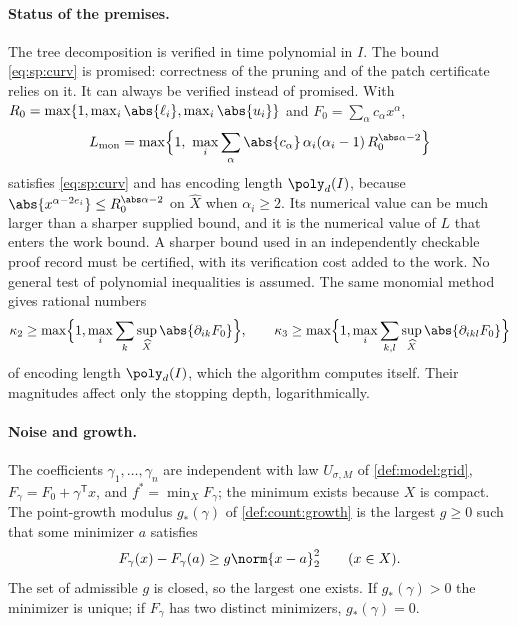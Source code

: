 \paragraph{Status of the premises.}
The tree decomposition is verified in time polynomial in $I$. The bound
\eqref{eq:sp:curv} is promised: correctness of the pruning and of the patch
certificate relies on it. It can always be verified instead of promised.
With $R_0=\max\{1,\max_i\abs{\ell_i},\max_i\abs{u_i}\}$ and $F_0=\sum_\alpha
c_\alpha x^\alpha$,
\begin{equation}\label{eq:sp:Lmon}
 L_{\rm mon}=\max\Bigl\{1,\ \max_i\sum_\alpha\abs{c_\alpha}\,
 \alpha_i(\alpha_i-1)\,R_0^{\abs\alpha-2}\Bigr\}
\end{equation}
satisfies \eqref{eq:sp:curv} and has encoding length $\poly_d(I)$, because
$\abs{x^{\alpha-2e_i}}\le R_0^{\abs\alpha-2}$ on $\widehat X$ when
$\alpha_i\ge2$. Its numerical value can be much larger than a sharper
supplied bound, and it is the numerical value of $L$ that enters the work
bound. A sharper bound used in an independently checkable proof record must
be certified, with its verification cost added to the work. No general test
of polynomial inequalities is assumed. The same monomial method gives
rational numbers
\begin{equation}\label{eq:sp:kappa}
 \kappa_2\ge\max\Bigl\{1,\max_i\sum_k\sup_{\widehat X}\abs{\partial_{ik}F_0}\Bigr\},
 \qquad
 \kappa_3\ge\max\Bigl\{1,\max_i\sum_{k,l}\sup_{\widehat X}\abs{\partial_{ikl}F_0}\Bigr\}
\end{equation}
of encoding length $\poly_d(I)$, which the algorithm computes itself. Their
magnitudes affect only the stopping depth, logarithmically.

\paragraph{Noise and growth.}
The coefficients $\gamma_1,\dots,\gamma_n$ are independent with law
$U_{\sigma,M}$ of \cref{def:model:grid}, $F_\gamma=F_0+\gamma^{\mathsf T}x$,
and $f^*=\min_XF_\gamma$; the minimum exists because $X$ is compact. The
point-growth modulus $g_*(\gamma)$ of \cref{def:count:growth} is the largest
$g\ge0$ such that some minimizer $a$ satisfies
\begin{equation}\label{eq:sp:growth}
 F_\gamma(x)-F_\gamma(a)\ge g\norm{x-a}_2^2\qquad(x\in X).
\end{equation}
The set of admissible $g$ is closed, so the largest one exists. If
$g_*(\gamma)>0$ the minimizer is unique; if $F_\gamma$ has two distinct
minimizers, $g_*(\gamma)=0$.

